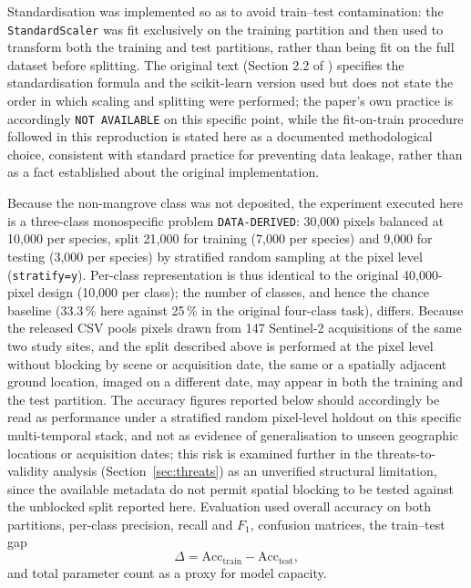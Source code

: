 \documentclass[10pt,twocolumn,a4paper]{article}
\newcommand{\evc}[1]{{\footnotesize\texttt{#1}}}
\begin{document}
Standardisation was implemented so as to avoid train--test contamination: the \texttt{StandardScaler}
was fit exclusively on the training partition and then used to transform both the training and test
partitions, rather than being fit on the full dataset before splitting. The original text (Section
2.2 of \citealp{monterrubio2025}) specifies the standardisation formula and the scikit-learn version
used but does not state the order in which scaling and splitting were performed; the paper's own
practice is accordingly \evc{NOT AVAILABLE} on this specific point, while the fit-on-train
procedure followed in this reproduction is stated here as a documented methodological choice,
consistent with standard practice for preventing data leakage, rather than as a fact established
about the original implementation.

Because the non-mangrove class was not deposited, the experiment executed here is a three-class
monospecific problem \evc{DATA-DERIVED}: 30{,}000 pixels balanced at 10{,}000 per species, split
21{,}000 for training (7{,}000 per species) and 9{,}000 for testing (3{,}000 per species) by
stratified random sampling at the pixel level (\texttt{stratify=y}). Per-class representation is
thus identical to the original 40{,}000-pixel design (10{,}000 per class); the number of classes,
and hence the chance baseline (33.3\,\% here against 25\,\% in the original four-class task),
differs. Because the released CSV pools pixels drawn from 147 Sentinel-2 acquisitions of the same
two study sites, and the split described above is performed at the pixel level without blocking by
scene or acquisition date, the same or a spatially adjacent ground location, imaged on a different
date, may appear in both the training and the test partition. The accuracy figures reported below
should accordingly be read as performance under a stratified random pixel-level holdout on this
specific multi-temporal stack, and not as evidence of generalisation to unseen geographic locations
or acquisition dates; this risk is examined further in the threats-to-validity analysis
(Section~\ref{sec:threats}) as an unverified structural limitation, since the available metadata do
not permit spatial blocking to be tested against the unblocked split reported here. Evaluation used
overall accuracy on both partitions, per-class precision, recall and $F_1$, confusion matrices, the
train--test gap
\begin{equation}
\Delta = \mathrm{Acc}_{\mathrm{train}}-\mathrm{Acc}_{\mathrm{test}},
\end{equation}
and total parameter count as a proxy for model capacity.
\end{document}
